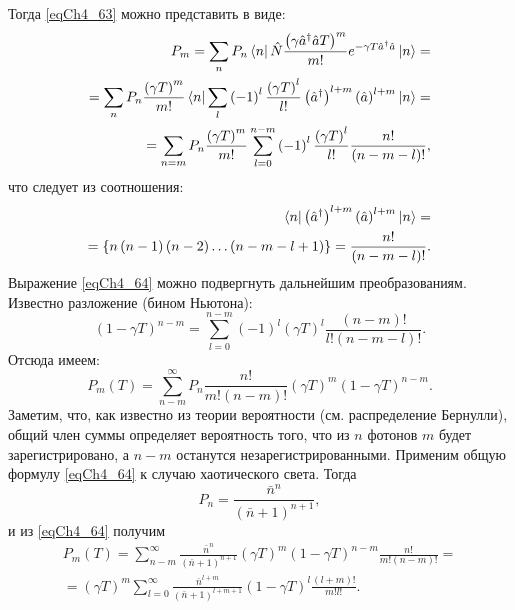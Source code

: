 Тогда \eqref{eqCh4_63} можно представить в виде:
\begin{eqnarray}
P_m = \sum_n P_n 
\bra{n}
\hat{N}
\frac{\left(\gamma \hat{a}^{\dag} \hat{a} T\right)^m}{m!}
e^{- \gamma T \hat{a}^{\dag} \hat{a}}
\ket{n} = 
\nonumber \\
=
\sum_n P_n 
\frac{\left(\gamma T\right)^m}{m!}
\bra{n}
\sum_l\left(-1\right)^l
\frac{\left(\gamma T\right)^l}{l!}
\left(\hat{a}^{\dag}\right)^{l + m}
\left(\hat{a}\right)^{l + m}
\ket{n} = 
\nonumber \\
=
\sum_{n = m}
P_n 
\frac{\left(\gamma T\right)^m}{m!}
\sum_{l = 0}^{n - m}\left(-1\right)^l
\frac{\left(\gamma T\right)^l}{l!}
\frac{n!}{\left(n - m - l\right)!},
\label{eqCh4_64}
\end{eqnarray}
что следует из соотношения:
\begin{eqnarray}
\bra{n}
\left(\hat{a}^{\dag}\right)^{l + m}
\left(\hat{a}\right)^{l + m}
\ket{n} = 
\nonumber \\
= \left\{
n \left(n - 1\right)\left(n - 2\right) \dotsc
\left(n - m - l + 1\right)
\right\} = 
\frac{n!}{\left(n - m - l\right)!}.
\nonumber
\end{eqnarray}
Выражение \eqref{eqCh4_64} можно подвергнуть дальнейшим
преобразованиям. Известно разложение (бином Ньютона): 
\[
\left(1 - \gamma T\right)^{n - m} = 
\sum_{l = 0}^{n -m}
\left(-1\right)^l
\left(\gamma T\right)^l
\frac{\left(n - m\right)!}{l!\left(n - m - l\right)!}.
\]
Отсюда имеем:
\begin{equation}
P_m\left(T\right) = 
\sum_{n - m}^{\infty}
P_n 
\frac{n!}{m!\left(n - m\right)!}
\left(\gamma T\right)^m
\left(1 - \gamma T\right)^{n - m}.
\label{eqCh4_64a}
\end{equation}
Заметим, что, как известно из теории вероятности (см. распределение
Бернулли), общий член суммы определяет вероятность того, что из $n$
фотонов $m$ будет зарегистрировано, а  $n - m$  останутся
незарегистрированными. Применим общую формулу \eqref{eqCh4_64} к случаю
хаотического света. Тогда  
\[
P_n = \frac{\bar{n}^n}{\left(\bar{n} + 1\right)^{n + 1}},
\]
и из \eqref{eqCh4_64} получим 
\begin{eqnarray}
P_m\left(T\right) = 
\sum_{n - m}^{\infty}
\frac{\bar{n}^n}{\left(\bar{n} + 1\right)^{n + 1}}
\left(\gamma T\right)^m
\left(1 - \gamma T\right)^{n - m} 
\frac{n!}{m!\left(n - m\right)!}
=
\nonumber \\
=
\left(\gamma T\right)^m
\sum_{l = 0}^{\infty}
\frac{\bar{n}^{l + m}}{\left(\bar{n} + 1\right)^{l + m + 1}}
\left(1 - \gamma T\right)^{l}
\frac{\left(l + m\right)!}{m! l!}. 
\label{eqCh4_65}
\end{eqnarray}

